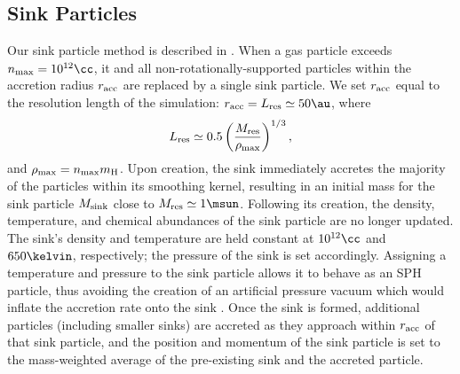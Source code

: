\subsection{Sink Particles}
\label{sinkParticles}
Our sink particle method is described in \citet{StacyGreifBromm2010}. When a gas particle exceeds $n_{\rm max} = 10^{12}\cc$, it and all non-rotationally-supported particles within the accretion radius $r_{\rm acc}$ are replaced by a single sink particle.  We set $r_{\rm acc}$ equal to the resolution length of the simulation: $r_{\rm acc} = L_{\rm res} \simeq 50\au$, where 
\begin{equation}
L_{\rm res} \simeq 0.5 \left( \frac{M_{\rm res}}{\rho_{\rm max}} \right)^{1/3},
\end{equation}
and $\rho_{\rm max} = n_{\rm max} m_{\rm H}$.  Upon creation, the sink immediately accretes the majority of the particles within its smoothing kernel, resulting in an initial mass for the sink particle $M_{\rm sink}$ close to $M_{\rm res} \simeq 1\msun$.  Following its creation, the density, temperature, and chemical abundances of the sink particle are no longer updated.  The sink's density and temperature are held constant at $10^{12}\cc$ and $650\kelvin$, respectively; the pressure of the sink is set accordingly. Assigning a temperature and pressure to the sink particle allows it to behave as an SPH particle, thus avoiding the creation of an artificial pressure vacuum which would inflate the accretion rate onto the sink \citep[see][]{BrommCoppiLarson2002, MartelEvansShapiro2006}. Once the sink is formed, additional particles (including smaller sinks) are accreted as they approach within $r_{\rm acc}$ of that sink particle, and the position and momentum of the sink particle is set to the mass-weighted average of the pre-existing sink and the accreted particle.